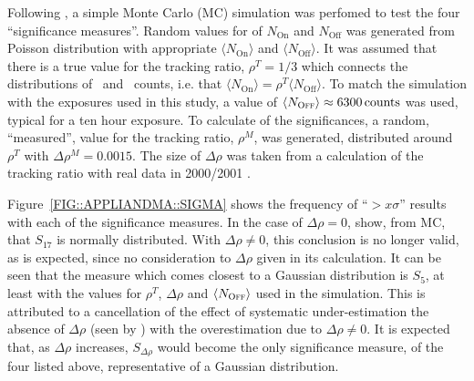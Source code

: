 Following \citet{REF::LIANDMA::1983APJ}, a simple Monte Carlo (MC)
simulation was perfomed to test the four ``significance
measures''. Random values for of $N_\mathrm{On}$ and $N_\mathrm{Off}$ 
was generated from Poisson distribution with appropriate 
$\langle N_\mathrm{On}\rangle$ and $\langle N_\mathrm{Off}\rangle$.  
It was assumed that there is a true value
for the tracking ratio, $\rho^T=1/3$ which connects the
distributions of \On\ and \Off\ counts, i.e. that $\langle
N_\mathrm{On}\rangle=\rho^T\langle N_\mathrm{Off}\rangle$. To match
the simulation with the exposures used in this study, a value of
$\langle N_{\textsc{Off}}\rangle\approx6300\,\mathrm{counts}$ was used,
typical for a ten hour exposure. To calculate of the significances, a
random, ``measured'', value for the tracking ratio, $\rho^M$, was
generated, distributed around $\rho^T$ with $\Delta\rho^M=0.0015$. The
size of $\Delta\rho$ was taken from a calculation of the tracking
ratio with real data in 2000/2001 \citep{REF::HORAN::2001THESIS}.

Figure~\ref{FIG::APPLIANDMA::SIGMA} shows the frequency of
``$>x\sigma$'' results with each of the significance measures. In the
case of $\Delta\rho=0$, \citet{REF::LIANDMA::1983APJ} show, from MC,
that $S_{17}$ is normally distributed. With $\Delta\rho\neq0$, this
conclusion is no longer valid, as is expected, since no consideration
to $\Delta\rho$ given in its calculation. It can be seen that the
measure which comes closest to a Gaussian distribution is $S_5$, at
least with the values for $\rho^T$, $\Delta\rho$ and $\langle
N_{\textsc{Off}}\rangle$ used in the simulation. This is attributed to a
cancellation of the effect of systematic under-estimation the absence
of $\Delta\rho$ (seen by \citet{REF::LIANDMA::1983APJ}) with the
overestimation due to $\Delta\rho\neq 0$. It is expected that, as
$\Delta\rho$ increases, $S_{\Delta\rho}$ would become the only
significance measure, of the four listed above, representative of a
Gaussian distribution.

